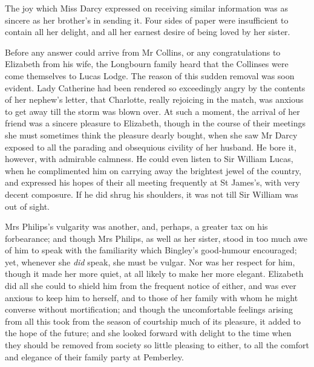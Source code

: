 The joy which Miss Darcy expressed on receiving similar information was as sincere as her brother's in sending it. Four sides of paper were insufficient to contain all her delight, and all her earnest desire of being loved by her sister.

Before any answer could arrive from Mr Collins, or any congratulations to Elizabeth from his wife, the Longbourn family heard that the Collinses were come themselves to Lucas Lodge. The reason of this sudden removal was soon evident. Lady Catherine had been rendered so exceedingly angry by the contents of her nephew's letter, that Charlotte, really rejoicing in the match, was anxious to get away till the storm was blown over. At such a moment, the arrival of her friend was a sincere pleasure to Elizabeth, though in the course of their meetings she must sometimes think the pleasure dearly bought, when she saw Mr Darcy exposed to all the parading and obsequious civility of her husband. He bore it, however, with admirable calmness. He could even listen to Sir William Lucas, when he complimented him on carrying away the brightest jewel of the country, and expressed his hopes of their all meeting frequently at St James's, with very decent composure. If he did shrug his shoulders, it was not till Sir William was out of sight.

Mrs Philips's vulgarity was another, and, perhaps, a greater tax on his forbearance; and though Mrs Philips, as well as her sister, stood in too much awe of him to speak with the familiarity which Bingley's good-humour encouraged; yet, whenever she \textit{did} speak, she must be vulgar. Nor was her respect for him, though it made her more quiet, at all likely to make her more elegant. Elizabeth did all she could to shield him from the frequent notice of either, and was ever anxious to keep him to herself, and to those of her family with whom he might converse without mortification; and though the uncomfortable feelings arising from all this took from the season of courtship much of its pleasure, it added to the hope of the future; and she looked forward with delight to the time when they should be removed from society so little pleasing to either, to all the comfort and elegance of their family party at Pemberley.